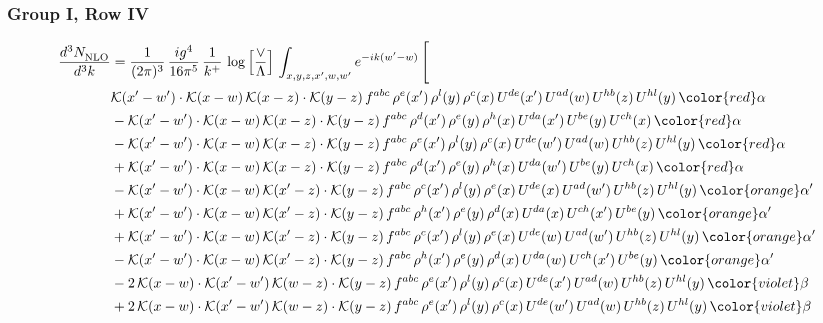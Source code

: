 \subsubsection{Group I, Row IV}
\begin{align}
    \frac{d^{3}N_{\rm NLO}^{\rm}}{d^{3}k}  & = \frac{1}{(2\pi)^{3}}\, \frac{ig^{4}}{16\pi^{5}}\, \frac{1}{k^{+}}\, \log{\left[\frac{\vee}{\Lambda}\right]}\, \int_{x,y,z,x^{\prime},w,w^{\prime}}e^{-ik(w^{\prime}-w)}\, \Bigg[\notag \\ & \mathcal{K}(x'-w')\cdot \mathcal{K}(x-w)\,\mathcal{K}(x-z)\cdot \mathcal{K}(y-z)\,f^{abc}\, \rho^{e}(x')\, \rho^{l}(y)\,\rho^{c}(x)\, U^{de}(x')\,U^{ad}(w)\,U^{hb}(z)\,U^{hl}(y)\, {\color{red}\alpha}\notag \\ & -\mathcal{K}(x'-w')\cdot \mathcal{K}(x-w)\,\mathcal{K}(x-z)\cdot \mathcal{K}(y-z)\,f^{abc}\, \rho^{d}(x')\, \rho^{e}(y)\,\rho^{h}(x)\, U^{da}(x')\,U^{be}(y)\,U^{ch}(x)\,{\color{red} \alpha}\notag \\ & -\mathcal{K}(x'-w')\cdot \mathcal{K}(x-w)\,\mathcal{K}(x-z)\cdot \mathcal{K}(y-z)\,f^{abc}\, \rho^{e}(x')\, \rho^{l}(y)\,\rho^{c}(x)\, U^{de}(w')\,U^{ad}(w)\,U^{hb}(z)\,U^{hl}(y)\,{\color{red} \alpha}\notag\\ & +\mathcal{K}(x'-w')\cdot \mathcal{K}(x-w)\,\mathcal{K}(x-z)\cdot \mathcal{K}(y-z)\,f^{abc}\, \rho^{d}(x')\, \rho^{e}(y)\,\rho^{h}(x)\, U^{da}(w')\,U^{be}(y)\,U^{ch}(x)\,{\color{red} \alpha}\notag\\ &-\mathcal{K}(x'-w')\cdot\mathcal{K}(x-w)\,\mathcal{K}(x'-z)\cdot\mathcal{K}(y-z)\, f^{abc}\,\rho^{c}(x')\,\rho^{l}(y)\,\rho^{e}(x)\,U^{de}(x)\,U^{ad}(w')\,U^{hb}(z)\,U^{hl}(y)\,{\color{orange} \alpha'}\notag\\ & +\mathcal{K}(x'-w')\cdot\mathcal{K}(x-w)\,\mathcal{K}(x'-z)\cdot\mathcal{K}(y-z)\, f^{abc}\,\rho^{h}(x')\,\rho^{e}(y)\,\rho^{d}(x)\,U^{da}(x)\,U^{ch}(x')\,U^{be}(y)\,{\color{orange} \alpha'}\notag\\
&+\mathcal{K}(x'-w')\cdot\mathcal{K}(x-w)\,\mathcal{K}(x'-z)\cdot\mathcal{K}(y-z)\, f^{abc}\,\rho^{c}(x')\,\rho^{l}(y)\,\rho^{e}(x)\,U^{de}(w)\,U^{ad}(w')\,U^{hb}(z)\,U^{hl}(y)\,{\color{orange} \alpha'}\notag \\ &-\mathcal{K}(x'-w')\cdot\mathcal{K}(x-w)\,\mathcal{K}(x'-z)\cdot\mathcal{K}(y-z)\, f^{abc}\,\rho^{h}(x')\,\rho^{e}(y)\,\rho^{d}(x)\,U^{da}(w)\,U^{ch}(x')\,U^{be}(y)\,{\color{orange} \alpha'}\notag \\ &  -2\,\mathcal{K}(x-w)\cdot \mathcal{K}(x'-w')\, \mathcal{K}(w-z)\cdot \mathcal{K}(y-z)\, f^{abc}\,\rho^{e}(x')\,\rho^{l}(y)\,\rho^{c}(x)\, U^{de}(x')\,U^{ad}(w)\,U^{hb}(z)\,U^{hl}(y)\,{\color{violet} \beta}\notag\\ & +2\,\mathcal{K}(x-w)\cdot \mathcal{K}(x'-w')\, \mathcal{K}(w-z)\cdot \mathcal{K}(y-z)\, f^{abc}\,\rho^{e}(x')\,\rho^{l}(y)\,\rho^{c}(x)\, U^{de}(w')\,U^{ad}(w)\,U^{hb}(z)\,U^{hl}(y)\,{\color{violet} \beta}\notag\\

\end{align}
